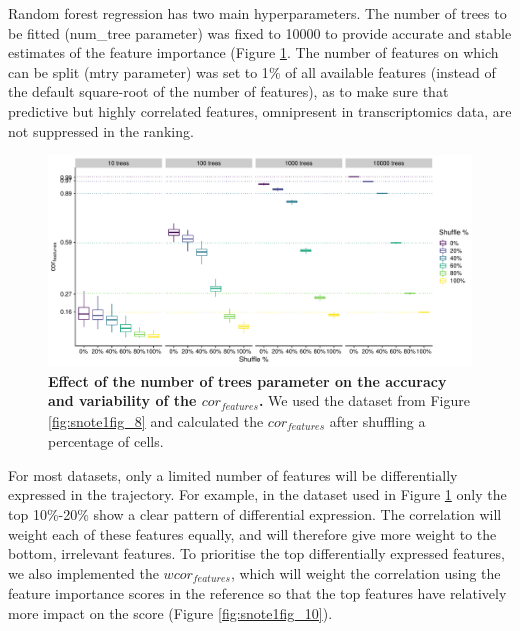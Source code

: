 Random forest regression has two main hyperparameters. The number of trees to be fitted (num\_tree parameter) was fixed to 10000 to provide accurate and stable estimates of the feature importance (Figure \ref{fig:snote1fig_9}. The number of features on which can be split (mtry parameter) was set to 1$\%$ of all available features (instead of the default square-root of the number of features), as to make sure that predictive but highly correlated features, omnipresent in transcriptomics data, are not suppressed in the ranking.

\begin{figure}[htb!]
	\centering\includegraphics[width=\linewidth]{fig/snote1fig_9.pdf}
	\caption{
		\textbf{Effect of the number of trees parameter on the accuracy and variability of the $\textit{cor}_{\textit{features}}$.} 
		We used the dataset from Figure \ref{fig:snote1fig_8} and calculated the $\textit{cor}_{\textit{features}}$ after shuffling a percentage of cells.
	}
	\label{fig:snote1fig_9}
\end{figure}

For most datasets, only a limited number of features will be differentially expressed in the trajectory. For example, in the dataset used in Figure \ref{fig:snote1fig_9} only the top 10$\%$-20$\%$ show a clear pattern of differential expression. The correlation will weight each of these features equally, and will therefore give more weight to the bottom, irrelevant features. To prioritise the top differentially expressed features, we also implemented the $\textit{wcor}_{\textit{features}}$, which will weight the correlation using the feature importance scores in the reference so that the top features have relatively more impact on the score (Figure \ref{fig:snote1fig_10}).

